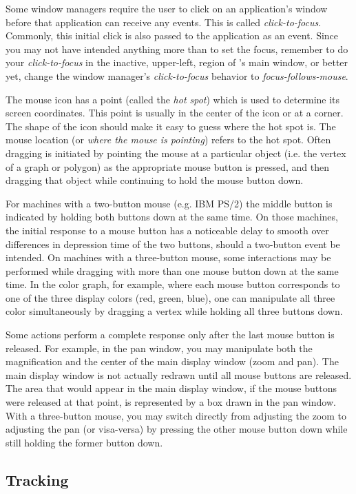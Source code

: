 Some window managers require the user to click on an application's
window before that application can receive any events.  This is called
{\em click-to-focus}.  Commonly, this initial click is also passed to the
application as an event.  Since you may not have intended anything more
than to set the focus, remember to do your {\em click-to-focus} in the
inactive, upper-left, region of {\SAO}'s main window, or better yet,
change the window manager's {\em click-to-focus} behavior to
{\em focus-follows-mouse}.

The mouse icon has a point (called the {\em hot spot}) which is used to
determine its screen coordinates.  This point is usually in the center of
the icon or at a corner.  The shape of the icon should make it easy to
guess where the hot spot is.  The mouse location
(or {\em where the mouse is pointing}) refers to the hot spot.
Often dragging is initiated by
pointing the mouse at a particular object (i.e. the vertex of a graph or
polygon) as the appropriate mouse button is pressed, and then dragging
that object while continuing to hold the mouse button down.

For machines with a two-button mouse (e.g. IBM PS/2) the
middle button is indicated by holding both buttons down at the same
time.  On those machines, the initial response to a mouse button has a
noticeable delay to smooth over differences in depression time of the two
buttons, should a two-button event be intended.  On machines with a
three-button mouse, some interactions may be performed while dragging with
more than one mouse button down at the same time.  In the color graph, for
example, where each mouse button corresponds to one of the three display
colors (red, green, blue), one can manipulate all three
color simultaneously by dragging a vertex while holding all three
buttons down.

Some actions perform a complete response only after the last mouse
button is released.  For example, in the pan window, you may manipulate
both the magnification and the
center of the main display window (zoom and pan).  The main display
window is not actually redrawn until all mouse buttons are released.
The area that would appear in the main display window, if the mouse
buttons were released at that point, is represented by a box drawn in
the pan window.  With a three-button mouse, you may switch directly
from adjusting the zoom to adjusting the pan (or visa-versa) by
pressing the other mouse button down while still holding the former
button down.

\subsection{ Tracking }

